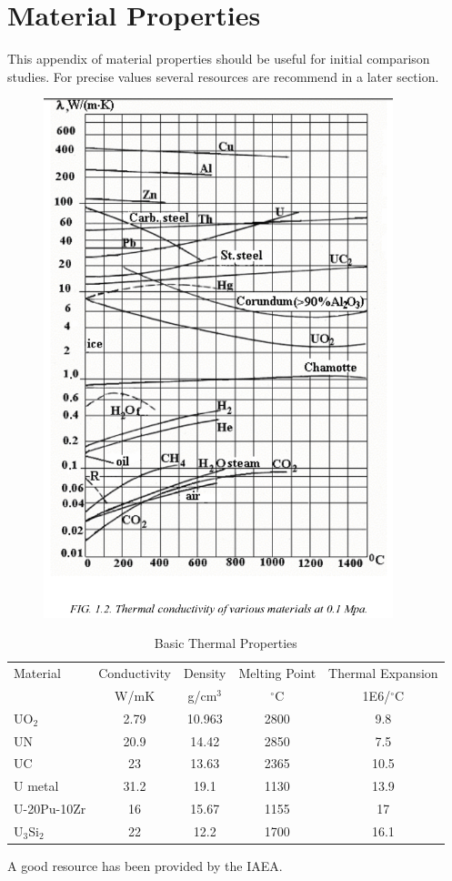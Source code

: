 \chapter*{Material Properties}
This appendix of material properties should be useful for initial comparison studies. For precise values several resources are recommend in a later section.


\begin{figure}[htbp]
  \centering
  \includegraphics[width=4in]{graphics/thermal-k.png}  
\end{figure}



\begin{table}
  \centering
  \caption{Basic Thermal Properties\cite{IAEA_1}}
  \begin{tabular}{lcccc}
    \toprule  
    Material & Conductivity & Density & Melting Point & Thermal Expansion\\ 
             & W/mK &    g/cm$^3$     &   $^{\circ}$C  &  1E6/$^{\circ}$C \\
    \midrule    
    UO$_2$ & 2.79 & 10.963 & 2800 & 9.8\\
    UN     & 20.9 & 14.42  & 2850 & 7.5\\
    UC     & 23   & 13.63  & 2365 & 10.5\\
    U metal & 31.2 & 19.1  & 1130 & 13.9\\
    U-20Pu-10Zr & 16 & 15.67 & 1155 &17\\
    U$_3$Si$_2$ & 22 & 12.2  & 1700 &16.1 \\
    \bottomrule
  \end{tabular}

\end{table}


A good resource has been provided by the IAEA\cite{IAEA_1}.









